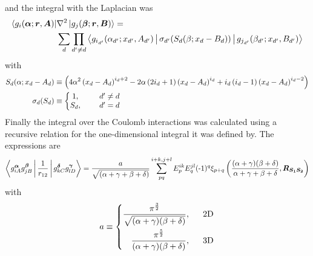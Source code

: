     and the integral with the Laplacian was
        \begin{equation}
            \begin{aligned}
                \Bra{g_i(\boldsymbol{{\alpha}};\boldsymbol{{r}},\boldsymbol{{A}})} &\nabla^2
                \Ket{g_j(\boldsymbol{{\beta}};\boldsymbol{{r}},\boldsymbol{{B}})} = \\
                &\sum_d\prod_{d'\neq d}
                \Braket{g_{i_{d'}}(\alpha_{d'};x_{d'},A_{d'})
                |\sigma_{d'}(S_d(\beta;x_d-B_d))|g_{j_{d'}}(\beta_{d'};x_{d'},B_{d'})}
            \end{aligned}
            \label{eq:lapintdefsum}
        \end{equation}
    with
        \begin{equation}
            \begin{aligned}
                S_d(\alpha;x_d-A_d) &\equiv
                \left(4\alpha^2\left(x_d-A_d\right)^{i_d+2} -
                2\alpha\left(2i_d+1\right)\left(x_d-A_d\right)^{i_d} +
                i_d\left(i_d-1\right)\left(x_d-A_d\right)^{i_d-2}\right) \\
                \sigma_d(S_d) &\equiv \left\{\begin{matrix}
                                            1,&\indent d' \neq d \\
                                            S_d,&\indent d' = d
                                            \end{matrix}
                                        \right.
            \end{aligned}
        \end{equation}
    Finally the integral over the Coulomb interactions was calculated using a
    recursive relation for the one-dimensional integral it was defined by. The
    expressions are
        \begin{equation}
            \Braket{g^{\blds{\alpha}}_{iA}g^{\blds{\beta}}_{jB} |
            \frac{1}{r_{12}} | g^{\blds{\delta}}_{kC}g^{\blds{\gamma}}_{lD}} =
            \frac{a}{\sqrt{(\alpha+\gamma+\beta+\delta)}} \suml{pq}{i+k,j+l}
            E^{ik}_pE^{jl}_q (\scalebox{1.0}[1.0]{-}1)^{q} \xi_{p+q}\left(\frac{(\alpha +
            \gamma)(\beta + \delta)}{\alpha + \gamma + \beta +
            \delta},\blds{R_{S_1S_2}}\right)
            \label{eq:coulombdistintdefsum}
        \end{equation}
    with
        \begin{equation}
            a \equiv \left\{\begin{aligned}
                \frac{\pi^{\frac{3}{2}}}
                {\sqrt{(\alpha+\gamma)(\beta+\delta)}},\indent \text{2D} \\
                \frac{\pi^{\frac{5}{2}}}
                {(\alpha+\gamma)(\beta+\delta)},\indent \text{3D} \\
            \end{aligned}\right.
        \end{equation}
